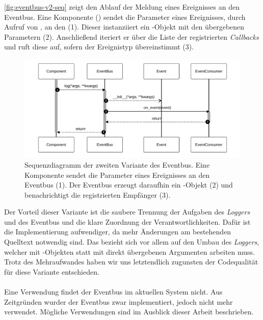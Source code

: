 \autoref{fig:eventbus-v2-seq} zeigt den Ablauf der Meldung eines Ereignisses an den Eventbus. Eine Komponente () sendet die Parameter eines Ereignisses, durch Aufruf von , an den  (1). Dieser instanziiert ein -Objekt mit den übergebenen Parametern (2). Anschließend iteriert er über die Liste der registrierten \emph{Callbacks} und ruft diese auf, sofern der Ereignistyp übereinstimmt (3).

\begin{figure}[!ht]
	\centering
	\includegraphics[width=1.0\linewidth]{images/diagrams/eventbus-v2-seq.pdf}
	\caption{Sequenzdiagramm der zweiten Variante des Eventbus. Eine Komponente sendet die Parameter eines Ereignisses an den Eventbus (1). Der Eventbus erzeugt daraufhin ein -Objekt (2) und benachrichtigt die registrierten Empfänger (3).}
	\label{fig:eventbus-v2-seq}
\end{figure}

Der Vorteil dieser Variante ist die saubere Trennung der Aufgaben des \emph{Loggers} und des Eventbus und die klare Zuordnung der Verantwortlichkeiten. Dafür ist die Implementierung aufwendiger, da mehr Änderungen am bestehenden Quelltext notwendig sind. Das bezieht sich vor allem auf den Umbau des \emph{Loggers}, welcher mit -Objekten statt mit direkt übergebenen Argumenten arbeiten muss. Trotz des Mehraufwandes haben wir uns letztendlich zugunsten der Codequalität für diese Variante entschieden.\\
\\
Eine Verwendung findet der Eventbus im aktuellen System nicht. Aus Zeitgründen wurder der Eventbus zwar implementiert, jedoch nicht mehr verwendet. Mögliche Verwendungen sind im Ausblick dieser Arbeit beschrieben.